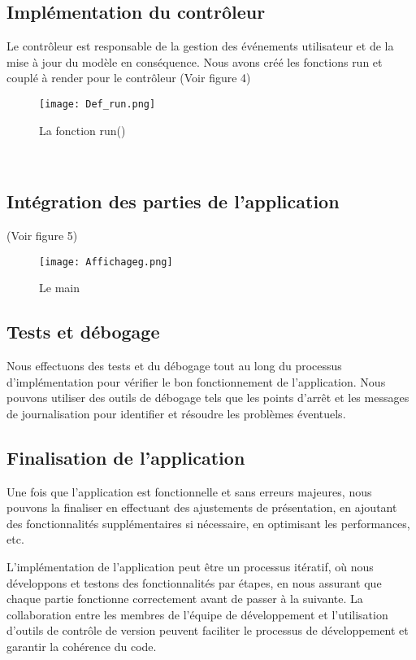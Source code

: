\documentclass[12pt,a4paper]{report}
\begin{document}
\subsection{Implémentation du contrôleur}
Le contrôleur est responsable de la gestion des événements utilisateur et de la mise à jour du modèle en conséquence. Nous avons créé les fonctions run et couplé à render pour le contrôleur (Voir figure 4)\\
\begin{figure}[h]
    \centering
    \texttt{[image: Def\_run.png]}
    \caption{La fonction run()}
    \label{fig:exemple}
\end{figure}
\\

\subsection{Intégration des parties de l'application}
(Voir figure 5)
\begin{figure}[h]
    \centering
    \texttt{[image: Affichageg.png]}
    \caption{Le main}
    \label{fig:exemple}
\end{figure}


\subsection{Tests et débogage}
Nous effectuons des tests et du débogage tout au long du processus d'implémentation pour vérifier le bon fonctionnement de l'application. Nous pouvons utiliser des outils de débogage tels que les points d'arrêt et les messages de journalisation pour identifier et résoudre les problèmes éventuels.\\

\subsection{Finalisation de l'application}
Une fois que l'application est fonctionnelle et sans erreurs majeures, nous pouvons la finaliser en effectuant des ajustements de présentation, en ajoutant des fonctionnalités supplémentaires si nécessaire, en optimisant les performances, etc.

L'implémentation de l'application peut être un processus itératif, où nous développons et testons des fonctionnalités par étapes, en nous assurant que chaque partie fonctionne correctement avant de passer à la suivante. La collaboration entre les membres de l'équipe de développement et l'utilisation d'outils de contrôle de version peuvent faciliter le processus de développement et garantir la cohérence du code.
\end{document}
